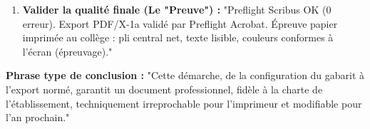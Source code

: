 \documentclass[11pt]{article}
\begin{document}
\begin{methode}
\begin{enumerate}
              \begin{itemize}
                  \item \textbf{Hiérarchie visuelle :} "Titre 24pt Bleu Marine en haut $\rightarrow$ Accroche regard. Photo fond traitée en transparence 30\% (ou voile blanc sur photo) $\rightarrow$ Lisibilité texte préservée."
                  \item \textbf{Habillage :} "Cercle d'habillage invisible pour le titre $\rightarrow$ Dynamisme, casse la rigidité des colonnes."
                  \item \textbf{Couleur :} "Passage RVB $\rightarrow$ CMJN profil ISO Coated v2 $\rightarrow$ Fidélité couleurs impression (le bleu marine ne vire pas au violet)."
              \end{itemize}
        \item \textbf{Valider la qualité finale (Le "Preuve") :} "Preflight Scribus OK (0 erreur). Export PDF/X-1a validé par Preflight Acrobat. Épreuve papier imprimée au collège : pli central net, texte lisible, couleurs conformes à l'écran (épreuvage)."
    \end{enumerate}
    \textbf{Phrase type de conclusion :} "Cette démarche, de la configuration du gabarit à l'export normé, garantit un document professionnel, fidèle à la charte de l'établissement, techniquement irreprochable pour l'imprimeur et modifiable pour l'an prochain."
\end{methode}
\end{document}
